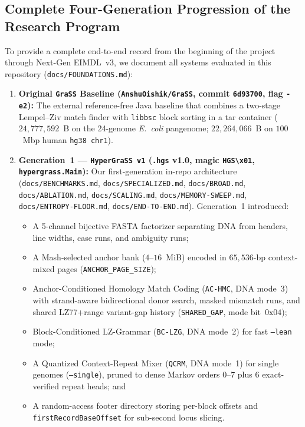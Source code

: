 \documentclass[10pt]{article}
\theoremstyle{definition}
\begin{document}
\subsection{Complete Four-Generation Progression of the Research Program}

To provide a complete end-to-end record from the beginning of the project through Next-Gen EIMDL~v3, we document all systems evaluated in this repository (\texttt{docs/FOUNDATIONS.md}):
\begin{enumerate}
  \item \textbf{Original \texttt{GraSS} Baseline (\texttt{AnshuOishik/GraSS}, commit \texttt{6d93700}, flag \texttt{-e2}):} The external reference-free Java baseline that combines a two-stage Lempel--Ziv match finder with \texttt{libbsc} block sorting in a tar container ($24,777,592$~B on the 24-genome \textit{E.~coli} pangenome; $22,264,066$~B on $100$~Mbp human \texttt{hg38 chr1}).
  \item \textbf{Generation~1 --- \texttt{HyperGraSS v1} (\texttt{.hgs} v1.0, magic \texttt{HGS\textbackslash x01}, \texttt{hypergrass.Main}):} Our first-generation in-repo architecture (\texttt{docs/BENCHMARKS.md}, \texttt{docs/SPECIALIZED.md}, \texttt{docs/BROAD.md}, \texttt{docs/ABLATION.md}, \texttt{docs/SCALING.md}, \texttt{docs/MEMORY-SWEEP.md}, \texttt{docs/ENTROPY-FLOOR.md}, \texttt{docs/END-TO-END.md}). Generation~1 introduced:
  \begin{itemize}
    \item A 5-channel bijective FASTA factorizer separating DNA from headers, line widths, case runs, and ambiguity runs;
    \item A Mash-selected anchor bank ($4\text{--}16$~MiB) encoded in $65,536$-bp context-mixed pages (\texttt{ANCHOR\_PAGE\_SIZE});
    \item Anchor-Conditioned Homology Match Coding (\texttt{AC-HMC}, DNA mode~3) with strand-aware bidirectional donor search, masked mismatch runs, and shared LZ77+range variant-gap history (\texttt{SHARED\_GAP}, mode bit~$0\text{x}04$);
    \item Block-Conditioned LZ-Grammar (\texttt{BC-LZG}, DNA mode~2) for fast \texttt{--lean} mode;
    \item A Quantized Context-Repeat Mixer (\texttt{QCRM}, DNA mode~1) for single genomes (\texttt{--single}), pruned to dense Markov orders $0\text{--}7$ plus 6 exact-verified repeat heads; and
    \item A random-access footer directory storing per-block offsets and \texttt{firstRecordBaseOffset} for sub-second locus slicing.

\end{itemize}
\end{enumerate}
\end{document}
